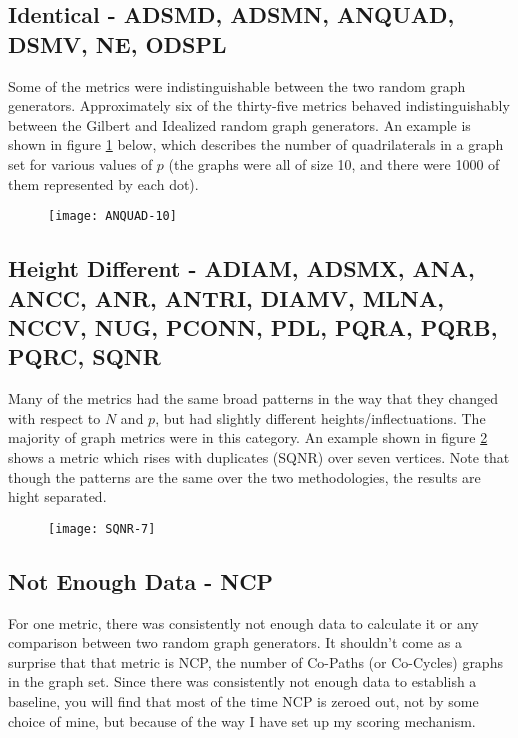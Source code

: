 \subsection*{Identical - ADSMD, ADSMN, ANQUAD, DSMV, NE, ODSPL} 
Some of the metrics were indistinguishable between the two random graph generators.
Approximately six of the thirty-five metrics behaved indistinguishably between the Gilbert and Idealized random graph generators.
An example is shown in figure \ref{fig:anquad10} below, which describes the number of quadrilaterals in a graph set for various values of $p$ (the graphs were all of size 10, and there were 1000 of them represented by each dot).

\begin{figure}[h]
\caption{}
\centering
\texttt{[image: ANQUAD-10]}
\label{fig:anquad10}
\end{figure}

\subsection*{Height Different - ADIAM, ADSMX, ANA, ANCC, ANR, ANTRI, DIAMV, MLNA, NCCV, NUG, PCONN, PDL, PQRA, PQRB, PQRC, SQNR} 
Many of the metrics had the same broad patterns in the way that they changed with respect to $N$ and $p$, but had slightly different heights/inflectuations.
The majority of graph metrics were in this category.
An example shown in figure \ref{fig:sqnr7} shows a metric which rises with duplicates (SQNR) over seven vertices.
Note that though the patterns are the same over the two methodologies, the results are hight separated.

\begin{figure}[h]
\caption{}
\centering
\texttt{[image: SQNR-7]}
\label{fig:sqnr7}
\end{figure}

\subsection*{Not Enough Data - NCP}
For one metric, there was consistently not enough data to calculate it or any comparison between two random graph generators.
It shouldn't come as a surprise that that metric is NCP, the number of Co-Paths (or Co-Cycles) graphs in the graph set. 
Since there was consistently not enough data to establish a baseline, you will find that most of the time NCP is zeroed out, not by some choice of mine, but because of the way I have set up my scoring mechanism.

